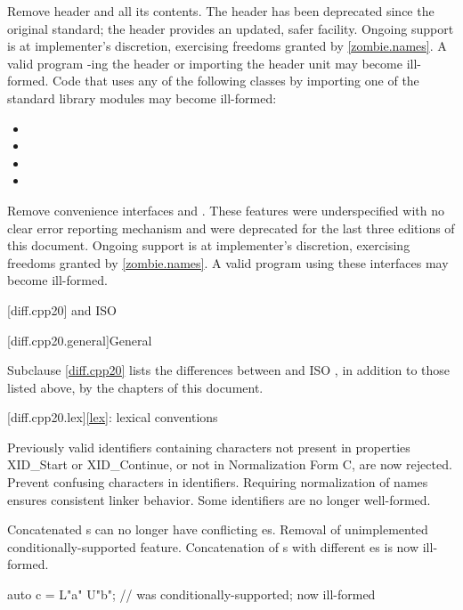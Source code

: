 \nodiffref
\change
Remove header  and all its contents.
\rationale
The header has been deprecated since the original \Cpp{} standard; the
 header provides an updated, safer facility.
Ongoing support is at implementer's discretion,
exercising freedoms granted by \ref{zombie.names}.
\effect
A valid \CppXXIII{} program -ing the header or importing the
header unit may become ill-formed. Code that uses any of the following classes
by importing one of the standard library modules may become ill-formed:
\begin{itemize}
\item {}
\item {}
\item {}
\item {}
\end{itemize}

\nodiffref
\change
Remove convenience interfaces  and
.
\rationale
These features were underspecified with no clear error reporting mechanism and
were deprecated for the last three editions of this document.
Ongoing support is at implementer's discretion,
exercising freedoms granted by \ref{zombie.names}.
\effect
A valid \CppXXIII{} program using these interfaces may become ill-formed.

[diff.cpp20]{\Cpp{} and ISO \CppXX{}}

[diff.cpp20.general]{General}

\pnum
{}%
Subclause \ref{diff.cpp20} lists the differences between \Cpp{} and
ISO \CppXX{},
in addition to those listed above,
by the chapters of this document.

[diff.cpp20.lex]{\ref{lex}: lexical conventions}

%
%
\change
Previously valid identifiers containing characters
not present in  properties XID_Start or XID_Continue, or
not in Normalization Form C, are now rejected.
\rationale
Prevent confusing characters in identifiers.
Requiring normalization of names ensures consistent linker behavior.
\effect
Some identifiers are no longer well-formed.

\change
Concatenated s can no longer have
conflicting es.
\rationale
Removal of unimplemented conditionally-supported feature.
\effect
Concatenation of s
with different es
is now ill-formed.
\begin{example}
\begin{codeblock}
auto c = L"a" U"b";             // was conditionally-supported; now ill-formed
\end{codeblock}
\end{example}

